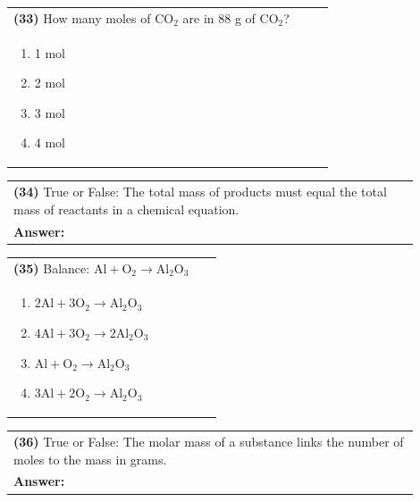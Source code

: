 \documentclass{article}
\begin{document}
\vspace{0.2cm}
\noindent \begin{tabular}{|p{0.9\linewidth}|}
\hline
\vspace{0.2cm}
\textbf{(33)} How many moles of $\mathrm{CO_2}$ are in 88 g of $\mathrm{CO_2}$?\\
\begin{minipage}[t]{0.85\linewidth}
\begin{enumerate}[label=\alph*.]
\item 1 mol
\item 2 mol
\item 3 mol
\item 4 mol
\end{enumerate}
\end{minipage}\\
\hline
\end{tabular}

\vspace{0.2cm}
\noindent \begin{tabular}{|p{0.9\linewidth}|}
\hline
\vspace{0.2cm}
\textbf{(34)} True or False: The total mass of products must equal the total mass of reactants in a chemical equation.\\
\textbf{Answer:} \underline{\hspace{2cm}}\\
\hline
\end{tabular}

\vspace{0.2cm}
\noindent \begin{tabular}{|p{0.9\linewidth}|}
\hline
\vspace{0.2cm}
\textbf{(35)} Balance: $\mathrm{Al + O_2 \rightarrow Al_2O_3}$\\
\begin{minipage}[t]{0.85\linewidth}
\begin{enumerate}[label=\alph*.]
\item $\mathrm{2Al + 3O_2 \rightarrow Al_2O_3}$
\item $\mathrm{4Al + 3O_2 \rightarrow 2Al_2O_3}$
\item $\mathrm{Al + O_2 \rightarrow Al_2O_3}$
\item $\mathrm{3Al + 2O_2 \rightarrow Al_2O_3}$
\end{enumerate}
\end{minipage}\\
\hline
\end{tabular}

\vspace{0.2cm}
\noindent \begin{tabular}{|p{0.9\linewidth}|}
\hline
\vspace{0.2cm}
\textbf{(36)} True or False: The molar mass of a substance links the number of moles to the mass in grams.\\
\textbf{Answer:} \underline{\hspace{2cm}}\\
\hline
\end{tabular}
\newpage
\end{document}

